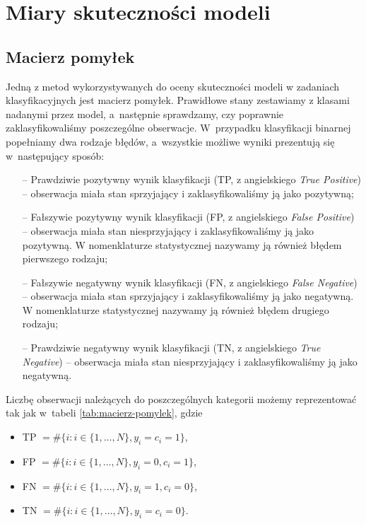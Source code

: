 \documentclass[inzynierska]{pwr_wmat_praca_dyplomowa}
\theoremstyle{plain}
\numberwithin{theorem}{chapter}
\theoremstyle{definition}
\numberwithin{theorem}{chapter}
\begin{document}
\section{Miary skuteczności modeli}

\subsection{Macierz pomyłek}

Jedną z metod wykorzystywanych do oceny skuteczności modeli w zadaniach klasyfikacyjnych jest macierz pomyłek. Prawidłowe stany zestawiamy z klasami nadanymi przez model, a~następnie sprawdzamy, czy poprawnie zaklasyfikowaliśmy poszczególne obserwacje. W~przypadku klasyfikacji binarnej popełniamy dwa rodzaje błędów, a~wszystkie możliwe wyniki prezentują się w~następujący sposób:
\begin{itemize}
	\item[--] Prawdziwie pozytywny wynik klasyfikacji (TP, z angielskiego \textit{True Positive}) -- obserwacja miała stan sprzyjający i zaklasyfikowaliśmy ją jako pozytywną;
	\item[--] Fałszywie pozytywny wynik klasyfikacji (FP, z angielskiego \textit{False Positive}) -- obserwacja miała stan niesprzyjający i zaklasyfikowaliśmy ją jako pozytywną. W nomenklaturze statystycznej nazywamy ją również błędem pierwszego rodzaju;
	\item[--] Fałszywie negatywny wynik klasyfikacji (FN, z angielskiego \textit{False Negative}) -- obserwacja miała stan sprzyjający i zaklasyfikowaliśmy ją jako negatywną. W nomenklaturze statystycznej nazywamy ją również błędem drugiego rodzaju;
	\item[--] Prawdziwie negatywny wynik klasyfikacji (TN, z angielskiego \textit{True Negative}) -- obserwacja miała stan niesprzyjający i zaklasyfikowaliśmy ją jako negatywną.
\end{itemize}
\noindent Liczbę obserwacji należących do poszczególnych kategorii możemy reprezentować tak jak w~tabeli \ref{tab:macierz-pomylek}, gdzie
\begin{itemize}
	\item TP $ = \#\{i: i \in \{1,\dots,N\}, y_i = c_i = 1\}$,
	\item FP $ = \#\{i: i \in \{1,\dots,N\}, y_i = 0, c_i = 1\}$,
	\item FN $ = \#\{i: i \in \{1,\dots,N\}, y_i = 1, c_i = 0\}$,
	\item TN $ = \#\{i: i \in \{1,\dots,N\}, y_i = c_i = 0\}$.
\end{itemize}
\end{document}
